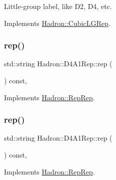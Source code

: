 Little-\/group label, like D2, D4, etc. 

Implements \mbox{\hyperlink{structHadron_1_1CubicLGRep_a9bdb14b519a611d21379ed96a3a9eb41}{Hadron\+::\+Cubic\+L\+G\+Rep}}.

\mbox{\label{structHadron_1_1D4A1Rep_a935e95f3ad80b6499e276424e3573730}} 
\subsubsection{\texorpdfstring{rep()}{rep()}\hspace{0.1cm}{\footnotesize\ttfamily [1/5]}}
{\footnotesize\ttfamily std\+::string Hadron\+::\+D4\+A1\+Rep\+::rep (\begin{DoxyParamCaption}{ }\end{DoxyParamCaption}) const\hspace{0.3cm}{\ttfamily [inline]}, {\ttfamily [virtual]}}



Implements \mbox{\hyperlink{structHadron_1_1RepRep_ab3213025f6de249f7095892109575fde}{Hadron\+::\+Rep\+Rep}}.

\mbox{\label{structHadron_1_1D4A1Rep_a935e95f3ad80b6499e276424e3573730}} 
\subsubsection{\texorpdfstring{rep()}{rep()}\hspace{0.1cm}{\footnotesize\ttfamily [2/5]}}
{\footnotesize\ttfamily std\+::string Hadron\+::\+D4\+A1\+Rep\+::rep (\begin{DoxyParamCaption}{ }\end{DoxyParamCaption}) const\hspace{0.3cm}{\ttfamily [inline]}, {\ttfamily [virtual]}}



Implements \mbox{\hyperlink{structHadron_1_1RepRep_ab3213025f6de249f7095892109575fde}{Hadron\+::\+Rep\+Rep}}.

\mbox{\label{structHadron_1_1D4A1Rep_a935e95f3ad80b6499e276424e3573730}} 
